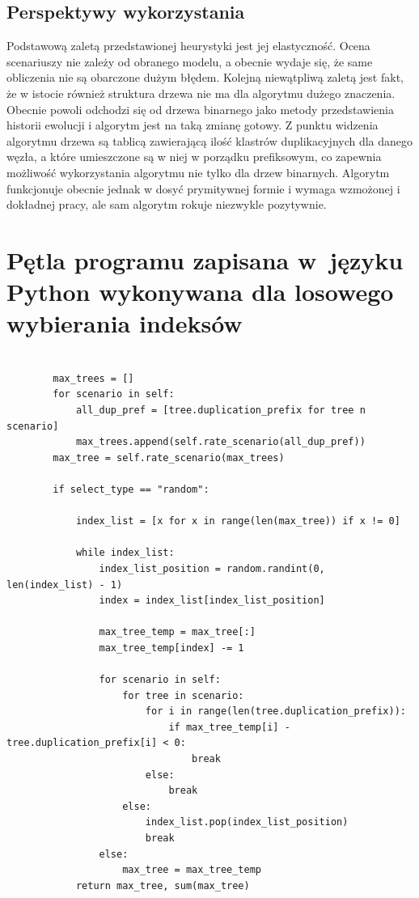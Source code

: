 \documentclass[licencjacka]{pracamgr}
\begin{document}
\section{Perspektywy wykorzystania}

Podstawową zaletą przedstawionej heurystyki jest jej elastyczność. Ocena scenariuszy nie zależy od obranego modelu, a obecnie wydaje się, że same obliczenia nie są obarczone dużym błędem. Kolejną niewątpliwą zaletą jest fakt, że w istocie również struktura drzewa nie ma dla algorytmu dużego znaczenia. Obecnie powoli odchodzi się od drzewa binarnego jako metody przedstawienia historii ewolucji i algorytm jest na taką zmianę gotowy. Z punktu widzenia algorytmu drzewa są tablicą zawierającą ilość klastrów duplikacyjnych dla danego węzła, a które umieszczone są w niej w porządku prefiksowym, co zapewnia możliwość wykorzystania algorytmu nie tylko dla drzew binarnych. Algorytm funkcjonuje obecnie jednak w dosyć prymitywnej formie i wymaga wzmożonej i dokładnej pracy, ale sam algorytm rokuje niezwykle pozytywnie.  

\appendix

\chapter{Pętla programu zapisana w~języku Python wykonywana dla losowego wybierania indeksów}

\begin{verbatim}

		max_trees = []
        for scenario in self:
            all_dup_pref = [tree.duplication_prefix for tree n scenario]
            max_trees.append(self.rate_scenario(all_dup_pref))
        max_tree = self.rate_scenario(max_trees)

        if select_type == "random":

            index_list = [x for x in range(len(max_tree)) if x != 0]

            while index_list:
                index_list_position = random.randint(0, len(index_list) - 1)
                index = index_list[index_list_position]

                max_tree_temp = max_tree[:]
                max_tree_temp[index] -= 1

                for scenario in self:
                    for tree in scenario:
                        for i in range(len(tree.duplication_prefix)):
                            if max_tree_temp[i] - tree.duplication_prefix[i] < 0:
                                break
                        else:
                            break
                    else:
                        index_list.pop(index_list_position)
                        break
                else:
                    max_tree = max_tree_temp
            return max_tree, sum(max_tree)
\end{verbatim}
\end{document}

